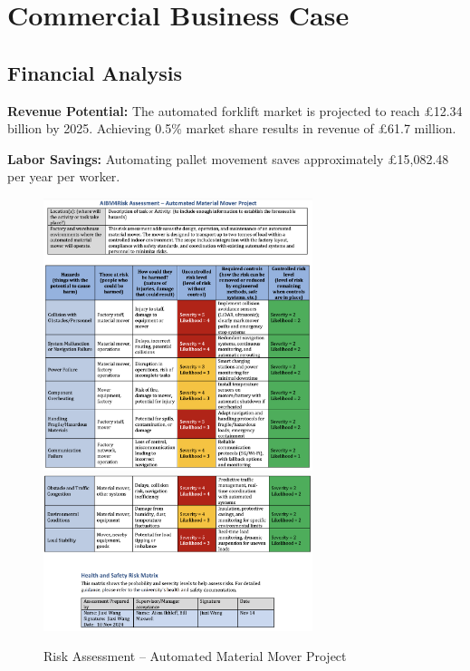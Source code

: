 \documentclass[12pt]{article}
\begin{document}
\newpage

\section{Commercial Business Case}
\subsection{Financial Analysis}
\textbf{Revenue Potential:} The automated forklift market is projected to reach £12.34 billion by 2025. Achieving 0.5\% market share results in revenue of £61.7 million.

\textbf{Labor Savings:} Automating pallet movement saves approximately £15,082.48 per year per worker.

\newpage

\begin{figure}[h!]
    \centering
    \includegraphics[width=0.7\textwidth]{Risk_Assessment_Automated_Material_Mover_Project1.png}
     \includegraphics[width=0.7\textwidth]{Risk_Assessment_Automated_Material_Mover_Project2.png}
    \caption{Risk Assessment – Automated Material Mover Project}
    \label{fig:risk_assessment}
\end{figure}
\end{document}

